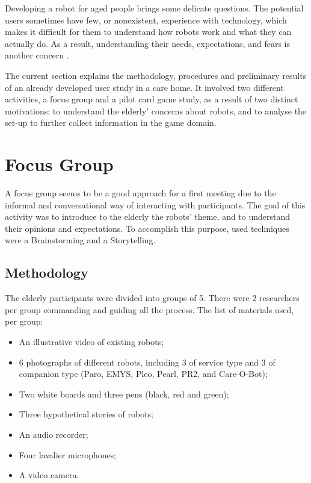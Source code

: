 \label{chapter:user-studies}

Developing a robot for aged people brings some delicate questions.
The potential users sometimes have few, or nonexistent, experience with technology, which makes it difficult for them to understand how robots work and what they can actually do.
As a result, understanding their needs, expectations, and fears is another concern \cite{Oliveira}.


The current section explains the methodology, procedures and preliminary results of an already developed user study in a care home.
It involved two different activities, a focus group and a pilot card game study, as a result of two distinct motivations: to understand the elderly' concerns about robots, and to analyse the set-up to further collect information in the game domain.




\section{Focus Group}

A focus group seems to be a good approach for a first meeting due to the informal and conversational way of interacting with participants.
The goal of this activity was to introduce to the elderly the robots' theme, and to understand their opinions and expectations.
To accomplish this purpose, used techniques were a Brainstorming and a Storytelling.

\subsection{Methodology}
The elderly participants were divided into groups of 5.
There were 2 researchers per group commanding and guiding all the process.
The list of materials used, per group:

\begin{itemize}
\item An illustrative video of existing robots;
\item 6 photographs of different robots, including 3 of service type and 3 of companion type (Paro, EMYS, Pleo, Pearl, PR2, and Care-O-Bot);
\item Two white boards and three pens (black, red and green);
\item Three hypothetical stories of robots;
\item An audio recorder;
\item Four lavalier microphones;
\item A video camera.
\end{itemize}

